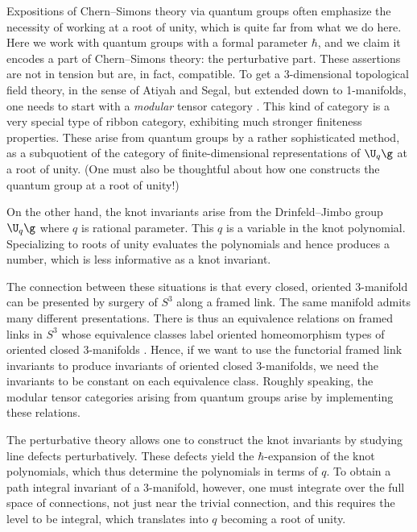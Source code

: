 \documentclass[10pt]{amsart}
\begin{document}
\begin{rmk}
Expositions of Chern--Simons theory via quantum groups often emphasize the necessity of working at a root of unity,
which is quite far from what we do here.
Here we work with quantum groups with a formal parameter $\hbar$,
and we claim it encodes a part of Chern--Simons theory: the perturbative part.
These assertions are not in tension but are, in fact, compatible. To get a 3-dimensional topological field theory, in the sense of Atiyah and Segal,
but extended down to 1-manifolds,
one needs to start with a {\em modular} tensor category \cite{BakKir, BDSPV}.
This kind of category is a very special type of ribbon category,
exhibiting much stronger finiteness properties.
These arise from quantum groups by a rather sophisticated method,
as a subquotient of the category of finite-dimensional representations of $\U_q \g$ at a root of unity.
(One must also be thoughtful about how one constructs the quantum group at a root of unity!)

On the other hand, the knot invariants arise from the Drinfeld--Jimbo group $\U_q\g$ where $q$ is rational parameter.
This $q$ is a variable in the knot polynomial.
Specializing to roots of unity evaluates the polynomials and hence produces a number,
which is less informative as a knot invariant.

The connection between these situations is that every closed, oriented 3-manifold can be presented by surgery of $S^3$ along a framed link.
The same manifold admits many different presentations.
There is thus an equivalence relations on framed links in $S^3$ whose equivalence classes label oriented homeomorphism types of oriented closed 3-manifolds \cite{Kirby, FenRou}.
Hence, if we want to use the functorial framed link invariants to produce invariants of oriented closed 3-manifolds,
we need the invariants to be constant on each equivalence class.
Roughly speaking, the modular tensor categories arising from quantum groups arise by implementing these relations.

The perturbative theory allows one to construct the knot invariants by studying line defects perturbatively.
These defects yield the $\hbar$-expansion of the knot polynomials,
which thus determine the polynomials in terms of $q$.
To obtain a path integral invariant of a 3-manifold, however, one must integrate over the full space of connections,
not just near the trivial connection,
and this requires the level to be integral, 
which translates into $q$ becoming a root of unity.
\end{rmk}
\end{document}
